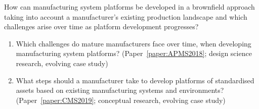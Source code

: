 \begin{resq}\label{resq3}
  How can manufacturing system platforms be developed in a brownfield approach taking into account a manufacturer's existing production landscape and which challenges arise over time as platform development progresses?
  \begin{enumerate}[leftmargin=3em, label=RQ\arabic{resq}.\arabic*]
    \item Which challenges do mature manufacturers face over time, when developing manufacturing system platforms? (Paper~\ref{paper:APMS2018}; design science research, evolving case study)
    \item What steps should a manufacturer take to develop platforms of standardised assets based on existing manufacturing systems and environments? (Paper~\ref{paper:CMS2019}; conceptual research, evolving case study)
  \end{enumerate}
\end{resq}